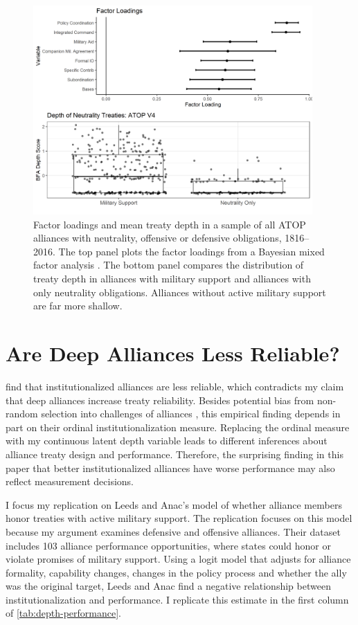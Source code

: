 \documentclass[12pt]{article}
\begin{document}
\begin{figure}[htbp]
	\centering
		\includegraphics[width=0.95\textwidth]{neutral-plot.png}
	\caption{Factor loadings and mean treaty depth in a sample of all ATOP alliances with neutrality, offensive or defensive obligations, 1816--2016. The top panel plots the factor loadings from a Bayesian mixed factor analysis \citep{Murrayetal2013}. The bottom panel compares the distribution of treaty depth in alliances with military support and alliances with only neutrality obligations. Alliances without active military support are far more shallow. 
	}
	\label{fig:neutral-plot}
\end{figure}

\section{Are Deep Alliances Less Reliable?} 


\citet{LeedsAnac2005} find that institutionalized alliances are less reliable, which contradicts my claim that deep alliances increase treaty reliability. 
Besides potential bias from non-random selection into challenges of alliances \citep{Smith1995}, this empirical finding depends in part on their ordinal institutionalization measure. 
Replacing the ordinal measure with my continuous latent depth variable leads to different inferences about alliance treaty design and performance. 
Therefore, the surprising finding in this paper that better institutionalized alliances have worse performance may also reflect measurement decisions. 


I focus my replication on Leeds and Anac's model of whether alliance members honor treaties with active military support. 
The replication focuses on this model because my argument examines defensive and offensive alliances. 
Their dataset includes 103 alliance performance opportunities, where states could honor or violate promises of military support. 
Using a logit model that adjusts for alliance formality, capability changes, changes in the policy process and whether the ally was the original target, Leeds and Anac find a negative relationship between institutionalization and performance. 
I replicate this estimate in the first column of \autoref{tab:depth-performance}. 
\end{document}

